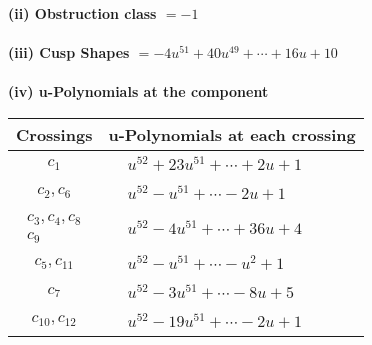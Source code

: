 \documentclass[1p]{elsarticle_modified}
\theoremstyle{definition}
\begin{document}
\flushleft \textbf{(ii) Obstruction class $= -1$}\\~\\
\flushleft \textbf{(iii) Cusp Shapes $= -4 u^{51}+40 u^{49}+\cdots+16 u+10$}\\~\\
\newpage\renewcommand{\arraystretch}{1}
\flushleft \textbf{(iv) u-Polynomials at the component}\newline \\
\begin{tabular}{m{50pt}|m{274pt}}
Crossings & \hspace{64pt}u-Polynomials at each crossing \\
\hline $$\begin{aligned}c_{1}\end{aligned}$$&$\begin{aligned}
&u^{52}+23 u^{51}+\cdots+2 u+1
\end{aligned}$\\
\hline $$\begin{aligned}c_{2},c_{6}\end{aligned}$$&$\begin{aligned}
&u^{52}- u^{51}+\cdots-2 u+1
\end{aligned}$\\
\hline $$\begin{aligned}c_{3},c_{4},c_{8}\\c_{9}\end{aligned}$$&$\begin{aligned}
&u^{52}-4 u^{51}+\cdots+36 u+4
\end{aligned}$\\
\hline $$\begin{aligned}c_{5},c_{11}\end{aligned}$$&$\begin{aligned}
&u^{52}- u^{51}+\cdots- u^2+1
\end{aligned}$\\
\hline $$\begin{aligned}c_{7}\end{aligned}$$&$\begin{aligned}
&u^{52}-3 u^{51}+\cdots-8 u+5
\end{aligned}$\\
\hline $$\begin{aligned}c_{10},c_{12}\end{aligned}$$&$\begin{aligned}
&u^{52}-19 u^{51}+\cdots-2 u+1
\end{aligned}$\\
\hline
\end{tabular}\\~\\
\end{document}
